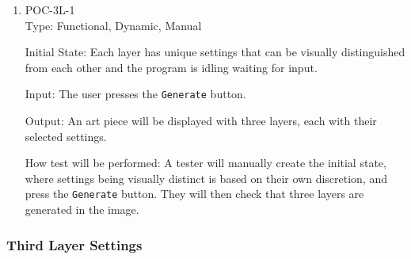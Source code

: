 \documentclass[12pt, titlepage]{article}
\begin{document}
\begin{enumerate}

\item{POC-3L-1}\\
Type: Functional, Dynamic, Manual

Initial State: Each layer has unique settings that can be visually distinguished from each other and the program is idling waiting for input.

Input: The user presses the \texttt{Generate} button.

Output: An art piece will be displayed with three layers, each with their selected settings.

How test will be performed: A tester will manually create the initial state, where settings being visually distinct is based on their own discretion, and press the \texttt{Generate} button. They will then check that three layers are generated in the image.

\setcounter{enumTemp}{\theenumi}
\end{enumerate}

\subsubsection{Third Layer Settings}
\end{document}
